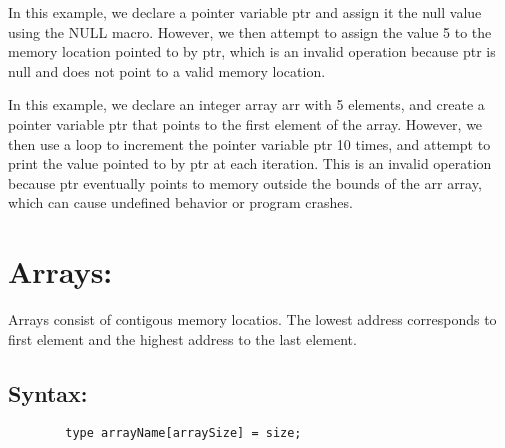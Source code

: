 \documentclass[
	12pt, %
]{fphw}
\begin{document}
\begin{problem}
	
In this example, we declare a pointer variable ptr and assign it the null 
value using the NULL macro. However, we then attempt to assign the value 5 to 
the memory location pointed to by ptr, which is an invalid operation because 
ptr is null and does not point to a valid memory location.
\end{problem}

\begin{problem}
	
In this example, we declare an integer array arr with 5 elements, and create 
a pointer variable ptr that points to the first element of the array. However,
we then use a loop to increment the pointer variable ptr 10 times, and attempt 
to print the value pointed to by ptr at each iteration. This is an invalid 
operation because ptr eventually points to memory outside the bounds of the 
arr array, which can cause undefined behavior or program crashes.

\end{problem}

\newpage

\section*{Arrays:}
Arrays consist of contigous memory locatios. The lowest address corresponds to 
first element and the highest address to the last element.
\begin{problem}
	\subsection*{Syntax:} 
	\begin{lstlisting}
		type arrayName[arraySize] = size;
	\end{lstlisting}
\end{problem}
\end{document}
